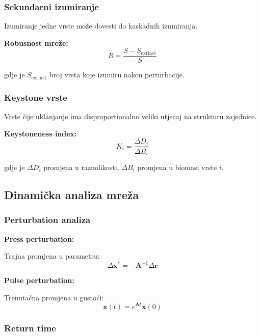 \documentclass[11pt,oneside]{book}
\begin{document}
\subsubsection{Sekundarni izumiranje}

Izumiranje jedne vrste može dovesti do kaskadnih izumiranja.

\textbf{Robusnost mreže:}
\begin{equation}
	R = \frac{S - S_{\text{extinct}}}{S}
\end{equation}

gdje je $S_{\text{extinct}}$ broj vrsta koje izumiru nakon perturbacije.

\subsubsection{Keystone vrste}

Vrste čije uklanjanje ima disproportionalno veliki utjecaj na strukturu zajednice.

\textbf{Keystoneness index:}
\begin{equation}
	K_i = \frac{\Delta D_i}{\Delta B_i}
\end{equation}

gdje je $\Delta D_i$ promjena u raznolikosti, $\Delta B_i$ promjena u biomasi vrste $i$.

\subsection{Dinamička analiza mreža}

\subsubsection{Perturbation analiza}

\textbf{Press perturbation:}

Trajna promjena u parametru:
\begin{equation}
	\Delta \mathbf{x}^* = -\mathbf{A}^{-1} \Delta \mathbf{r}
\end{equation}

\textbf{Pulse perturbation:}

Trenutačna promjena u gustoći:
\begin{equation}
	\mathbf{x}(t) = e^{\mathbf{A}t} \mathbf{x}(0)
\end{equation}

\subsubsection{Return time}
\end{document}
